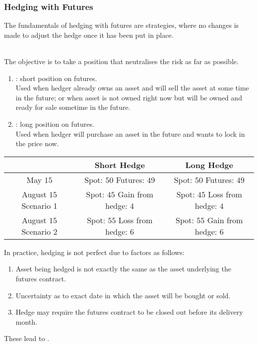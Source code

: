 \subsubsection{Hedging with Futures}

The fundamentals of hedging with futures are  strategies, where no changes is made to adjust the hedge once it has been put in place.

\begin{definition}
\\
The objective is to take a position that neutralises the risk as far as possible.
\begin{enumerate}[label=\roman*.]
\setlength{\itemsep}{0pt}
\item {}: short position on futures. \\
Used when hedger already owns an asset and will sell the asset at some time in the future; or when asset is not owned right now but will be owned and ready for sale sometime in the future.
\item {}: long position on futures. \\
Used when hedger will purchase an asset in the future and wants to lock in the price now.
\end{enumerate}
\begin{table}[h]
\begin{tabular}{|c | c | c|}
\hline
 & \textbf{Short Hedge} & \textbf{Long Hedge} \\ \hline
May $15$ & \makecell[l]{Spot: $50$ \\ Futures: $49$} & \makecell[l]{Spot: $50$ \\ Futures: $49$} \\ \hline
August $15$ Scenario 1 & \makecell[l]{Spot: $45$ \\ Gain from hedge: $4$} &  \makecell[l]{Spot: $45$ \\ Loss from hedge: $4$} \\ \hline
August $15$ Scenario 2 & \makecell[l]{Spot: $55$ \\ Loss from hedge: $6$} & \makecell[l]{Spot: $55$ \\ Gain from hedge: $6$} \\ \hline
\end{tabular}
\end{table}
\end{definition}

In practice, hedging is not perfect due to factors as follows:
\begin{enumerate}[label=\arabic*.]
\setlength{\itemsep}{0pt}
\item Asset being hedged is not exactly the same as the asset underlying the futures contract.
\item Uncertainty as to exact date in which the asset will be bought or sold.
\item Hedge may require the futures contract to be closed out before its delivery month.
\end{enumerate}
These lead to .

